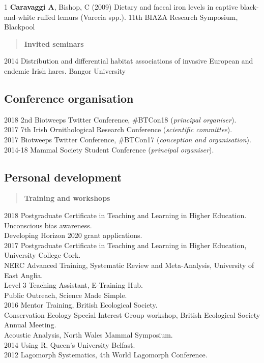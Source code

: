 \documentclass[]{article}
\begin{document}
1 \textbf{Caravaggi A}, Bishop, C (2009) Dietary and faecal iron levels
in captive black-and-white ruffed lemurs (Varecia spp.). 11th BIAZA
Research Symposium, Blackpool

\begin{quote}
\textbf{Invited seminars}
\end{quote}

2014 Distribution and differential habitat associations of invasive
European and endemic Irish hares. Bangor University

\subsection{Conference organisation}\label{conference-organisation}

2018 2nd Biotweeps Twitter Conference, \#BTCon18 (\emph{principal
organiser}).\\
2017 7th Irish Ornithological Research Conference (\emph{scientific
committee}).\\
2017 Biotweeps Twitter Conference, \#BTCon17 (\emph{conception and
organisation}).\\
2014-18 Mammal Society Student Conference (\emph{principal organiser}).

\subsection{Personal development}\label{personal-development}

\begin{quote}
\textbf{Training and workshops}
\end{quote}

2018 Postgraduate Certificate in Teaching and Learning in Higher
Education.\\
Unconscious bias awareness.\\
Developing Horizon 2020 grant applications.\\
2017 Postgraduate Certificate in Teaching and Learning in Higher
Education, University College Cork.\\
NERC Advanced Training, Systematic Review and Meta-Analysis, University
of East Anglia.\\
Level 3 Teaching Assistant, E-Training Hub.\\
Public Outreach, Science Made Simple.\\
2016 Mentor Training, British Ecological Society.\\
Conservation Ecology Special Interest Group workshop, British Ecological
Society Annual Meeting.\\
Acoustic Analysis, North Wales Mammal Symposium.\\
2014 Using R, Queen's University Belfast.\\
2012 Lagomorph Systematics, 4th World Lagomorph Conference.
\end{document}
